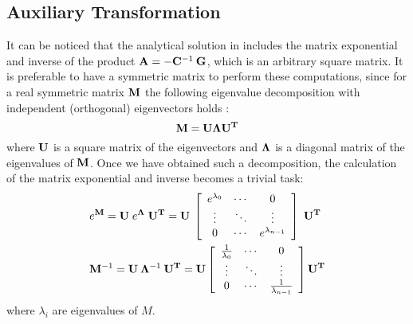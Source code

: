 \subsection{Auxiliary Transformation} \label{sec:ce-auxiliary}
It can be noticed that the analytical solution in  includes the matrix exponential and inverse of the product \mbox{$\mathbf{A} = - \mathbf{\mathbf{C}}^{-1} \: \mathbf{\mathbf{G}}$}, which is an arbitrary square matrix. It is preferable to have a symmetric matrix to perform these computations, since for a real symmetric matrix $\mathbf{M}$ the following eigenvalue decomposition with independent (orthogonal) eigenvectors holds \cite{press2007}:
\begin{equation} \label{eq:eigenvalue-decomposition}
  \mathbf{M} = \mathbf{\mathbf{U}} \mathbf{\Lambda} \mathbf{\mathbf{U}}^{\mathbf{T}}
\end{equation}
where $\mathbf{\mathbf{U}}$ is a square matrix of the eigenvectors and $\mathbf{\Lambda}$ is a diagonal matrix of the eigenvalues of $\mathbf{M}$. Once we have obtained such a decomposition, the calculation of the matrix exponential and inverse becomes a trivial task:
\begin{align*}
  & e^{\mathbf{M}} = \mathbf{\mathbf{U}} \; e^{\mathbf{\Lambda}} \; \mathbf{\mathbf{U}}^{\mathbf{T}} = \mathbf{\mathbf{U}}\: \left[
      \begin{array}{ccc}
        e^{\lambda_0} & \cdots & 0 \\
        \vdots & \ddots & \vdots \\
        0 & \cdots & e^{\lambda_{n - 1}}
      \end{array}
    \right] \; \mathbf{\mathbf{U}}^{\mathbf{T}} \\
  & \mathbf{M}^{-1} = \mathbf{\mathbf{U}} \: \mathbf{\Lambda}^{-1} \: \mathbf{\mathbf{U}}^{\mathbf{T}} = \mathbf{\mathbf{U}} \left[
      \begin{array}{ccc}
        \frac{1}{\lambda_0} & \cdots & 0 \\
        \vdots & \ddots & \vdots \\
        0 & \cdots & \frac{1}{\lambda_{n - 1}}
      \end{array}
    \right] \mathbf{\mathbf{U}}^{\mathbf{T}} \\
\end{align*}
where $\lambda_i$ are eigenvalues of $M$.

